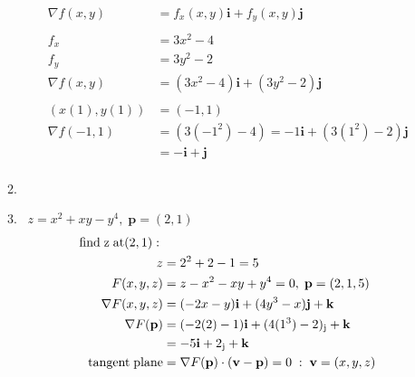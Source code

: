\documentclass[11pt]{article}
\newcommand\Item[1][]{%
  \ifx\relax#1\relax  \item \else \item[#1] \fi
  \abovedisplayskip=0pt\abovedisplayshortskip=0pt~\vspace*{-\baselineskip}}
\begin{document}
\begin{preview}
\begin{enumerate}
\begin{enumerate}
                  \begin{align*}
                      \nabla f(x,y)  & = f_{x}(x,y)\textbf{i} + f_{y}(x,y)\textbf{j}         \\\\
                      f_{x}          & = 3x^{2} - 4                                          \\
                      f_{y}          & = 3y^{2} - 2                                          \\
                      \nabla f(x,y)  & = (3x^{2} - 4)\textbf{i} + (3y^{2} - 2)\textbf{j}     \\\\
                      (x(1), y(1))   & = (-1, 1)                                             \\
                      \nabla f(-1,1) & = (3(-1^2) - 4)=-1\textbf{i} + (3(1^2) - 2)\textbf{j} \\
                                     & = -\textbf{i} + \textbf{j}                            \\
                  \end{align*}
                  \Item $z = x^2 + xy - y^4, \; \textbf{p} = (2,1)$ \\
                  \begin{align*}
                      \mathrm{find \; z \; at (2,1): \;} &                                                                                       \\
                      z                                  & = 2^2 + 2 - 1 = 5                                                                     \\
                      F(x,y,z)                           & = z - x^2 - xy + y^4 = 0, \; \textbf{p} = (2,1,5)                                     \\
                      \nabla F(x,y,z)                    & = (-2x - y)\textbf{i} + (4y^3 - x)\textbf{j} + \textbf{k}                             \\
                      \nabla F(\textbf{p})               & = (-2(2) - 1)\textbf{i} + (4(1^3) - 2)\textsubscript{j} + \textbf{k}                  \\
                                                         & = -5\textbf{i} + 2\textsubscript{j} + \textbf{k}                                      \\
                      \mathrm{tangent \; plane}          & = \nabla F(\textbf{p}) \cdot (\textbf{v} - \textbf{p}) = 0 \; : \; \textbf{v}=(x,y,z) \\

\end{align*}
\end{enumerate}
\end{enumerate}
\end{preview}
\end{document}
